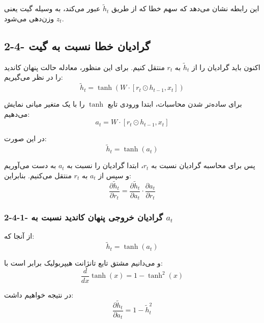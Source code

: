 \documentclass{article}
\begin{document}
این رابطه نشان می‌دهد که سهم خطا که از طریق $\widetilde{h}_t$ عبور می‌کند، به وسیله گیت  یعنی $z_t$ وزن‌دهی می‌شود.

\subsection{2-4- گرادیان خطا نسبت به گیت }

اکنون باید گرادیان را از $\widetilde{h}_t$ به $r_t$ منتقل کنیم.  
برای این منظور، معادله حالت پنهان کاندید را در نظر می‌گیریم:
\begin{equation}
	\widetilde{h}_t=\tanh\left(W\cdot[r_t\odot h_{t-1},x_t]\right)
\end{equation}

برای ساده‌تر شدن محاسبات، ابتدا ورودی تابع $\tanh$ را با یک متغیر میانی نمایش می‌دهیم:
\begin{equation}
	a_t=W\cdot[r_t\odot h_{t-1},x_t]
\end{equation}

در این صورت:
\begin{equation}
	\widetilde{h}_t=\tanh(a_t)
\end{equation}

پس برای محاسبه گرادیان نسبت به $r_t$، ابتدا گرادیان را نسبت به $a_t$ به دست می‌آوریم و سپس از $a_t$ به $r_t$ منتقل می‌کنیم. بنابراین:
\begin{equation}
	\frac{\partial \widetilde{h}_t}{\partial r_t}
	=
	\frac{\partial \widetilde{h}_t}{\partial a_t}
	\cdot
	\frac{\partial a_t}{\partial r_t}
\end{equation}

\subsubsection{2-4-1- گرادیان خروجی پنهان کاندید نسبت به $a_t$}

از آنجا که:
\begin{equation}
	\widetilde{h}_t=\tanh(a_t)
\end{equation}

و می‌دانیم مشتق تابع تانژانت هیپربولیک برابر است با:
\begin{equation}
	\frac{d}{dx}\tanh(x)=1-\tanh^2(x)
\end{equation}

در نتیجه خواهیم داشت:
\begin{equation}
	\frac{\partial \widetilde{h}_t}{\partial a_t}
	=
	1-\widetilde{h}_t^2
\end{equation}
\end{document}
